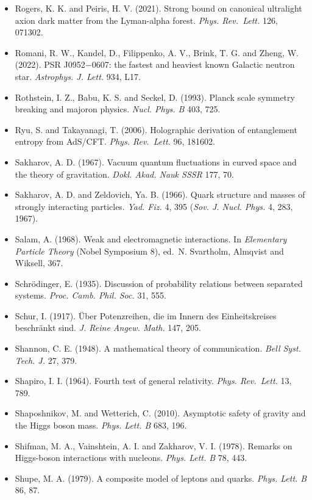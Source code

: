 \documentclass[
  11pt,
]{article}
\begin{document}
\begin{itemize}
  Rivero, A. (2011). A new Koide tuple: strange--charm--bottom. arXiv:1111.7232.
\item
  Rogers, K. K. and Peiris, H. V. (2021). Strong bound on canonical ultralight axion dark matter from the Lyman-alpha forest. \emph{Phys. Rev.~Lett.} 126, 071302.
\item
  Romani, R. W., Kandel, D., Filippenko, A. V., Brink, T. G. and Zheng, W. (2022). PSR J0952\ensuremath{-}0607: the fastest and heaviest known Galactic neutron star. \emph{Astrophys. J. Lett.} 934, L17.
\item
  Rothstein, I. Z., Babu, K. S. and Seckel, D. (1993). Planck scale symmetry breaking and majoron physics. \emph{Nucl. Phys. B} 403, 725.
\item
  Ryu, S. and Takayanagi, T. (2006). Holographic derivation of entanglement entropy from AdS/CFT. \emph{Phys. Rev.~Lett.} 96, 181602.
\item
  Sakharov, A. D. (1967). Vacuum quantum fluctuations in curved space and the theory of gravitation. \emph{Dokl. Akad. Nauk SSSR} 177, 70.
\item
  Sakharov, A. D. and Zeldovich, Ya. B. (1966). Quark structure and masses of strongly interacting particles. \emph{Yad. Fiz.} 4, 395 (\emph{Sov. J. Nucl. Phys.} 4, 283, 1967).
\item
  Salam, A. (1968). Weak and electromagnetic interactions. In \emph{Elementary Particle Theory} (Nobel Symposium 8), ed.~N. Svartholm, Almqvist and Wiksell, 367.
\item
  Schrödinger, E. (1935). Discussion of probability relations between separated systems. \emph{Proc. Camb. Phil. Soc.} 31, 555.
\item
  Schur, I. (1917). Über Potenzreihen, die im Innern des Einheitskreises beschränkt sind. \emph{J. Reine Angew. Math.} 147, 205.
\item
  Shannon, C. E. (1948). A mathematical theory of communication. \emph{Bell Syst. Tech. J.} 27, 379.
\item
  Shapiro, I. I. (1964). Fourth test of general relativity. \emph{Phys. Rev.~Lett.} 13, 789.
\item
  Shaposhnikov, M. and Wetterich, C. (2010). Asymptotic safety of gravity and the Higgs boson mass. \emph{Phys. Lett. B} 683, 196.
\item
  Shifman, M. A., Vainshtein, A. I. and Zakharov, V. I. (1978). Remarks on Higgs-boson interactions with nucleons. \emph{Phys. Lett. B} 78, 443.
\item
  Shupe, M. A. (1979). A composite model of leptons and quarks. \emph{Phys. Lett. B} 86, 87.

\end{itemize}
\end{document}
